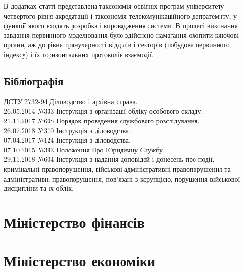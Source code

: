 В додатках статті представлена таксономія освітніх програм університету четвертого рівня акредатації і таксономія телекомунікаційного депратемнту, у функції якого входять розробка і впровадження системи. В процесі виконання завдання первинного моделювання було здійснено намагання охопити ключові органи, аж до рівня гранулярності відділів і секторів (побудова первинного індексу) і їх горизонтальних протоколів взаємодії.

\subsection{Бібліографія}

ДСТУ 2732-94 Діловодство і архівна справа. \\
26.05.2014 №333 Інструкція з організації обліку особового складу. \\
21.11.2017 №608 Порядок проведення службового розслідування. \\
26.07.2018 №370 Інструкція з діловодства. \\
07.04.2017 №124 Інструкція з діловодства. \\
07.10.2015 №393 Положення Про Юридичну Службу. \\
29.11.2018 №604 Інструкція з надання доповідей і донесень про події,
                кримінальні правопорушення, військові адміністративні
                правопорушення та адміністративні правопорушення,
                пов'язані з корупцією, порушення військової дисципліни та їх облік.

\section{Міністерство фінансів}

\section{Міністерство економіки}



